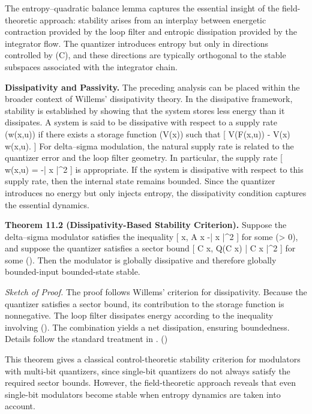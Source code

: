 \medskip

The entropy–quadratic balance lemma captures the essential insight of the field-theoretic approach: stability arises from an interplay between energetic contraction provided by the loop filter and entropic dissipation provided by the integrator flow. The quantizer introduces entropy but only in directions controlled by (C), and these directions are typically orthogonal to the stable subspaces associated with the integrator chain.

\medskip

\textbf{Dissipativity and Passivity.}
The preceding analysis can be placed within the broader context of Willems' dissipativity theory. In the dissipative framework, stability is established by showing that the system stores less energy than it dissipates. A system is said to be dissipative with respect to a supply rate (w(x,u)) if there exists a storage function (V(x)) such that
[
V(F(x,u)) - V(x) \leq w(x,u).
]
For delta–sigma modulation, the natural supply rate is related to the quantizer error and the loop filter geometry. In particular, the supply rate
[
w(x,u) = -\gamma | x |^{2}
]
is appropriate. If the system is dissipative with respect to this supply rate, then the internal state remains bounded. Since the quantizer introduces no energy but only injects entropy, the dissipativity condition captures the essential dynamics.

\medskip

\textbf{Theorem 11.2 (Dissipativity-Based Stability Criterion).}
Suppose the delta–sigma modulator satisfies the inequality
[
\langle x, A x \rangle \leq -\eta | x |^{2}
]
for some (\eta > 0), and suppose the quantizer satisfies a sector bound
[
\langle C x, Q(C x) \rangle \geq \kappa | C x |^{2}
]
for some (\kappa {}). Then the modulator is globally dissipative and therefore globally bounded-input bounded-state stable.

\textit{Sketch of Proof.}
The proof follows Willems’ criterion for dissipativity. Because the quantizer satisfies a sector bound, its contribution to the storage function is nonnegative. The loop filter dissipates energy according to the inequality involving (\eta). The combination yields a net dissipation, ensuring boundedness. Details follow the standard treatment in \cite{willems1972dissipative}. \hfill(\square)

\medskip

This theorem gives a classical control-theoretic stability criterion for modulators with multi-bit quantizers, since single-bit quantizers do not always satisfy the required sector bounds. However, the field-theoretic approach reveals that even single-bit modulators become stable when entropy dynamics are taken into account.

